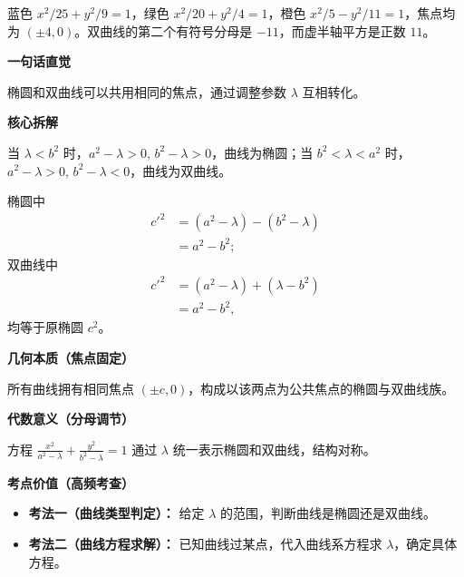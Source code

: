 \begin{explanationbox}
\begin{minipage}{\linewidth}
\begin{center}\end{center}
蓝色 $x^2/25+y^2/9=1$，绿色 $x^2/20+y^2/4=1$，橙色 $x^2/5-y^2/11=1$，焦点均为 $(\pm4,0)$。双曲线的第二个有符号分母是 $-11$，而虚半轴平方是正数 $11$。
\end{minipage}
\par\medskip

	\textbf{\textcolor{CExplanation}{一句话直觉}}

	\medskip
	椭圆和双曲线可以共用相同的焦点，通过调整参数 $\lambda$ 互相转化。

	\medskip
	\textbf{\textcolor{CExplanation}{核心拆解}}
	\begin{description}[style=nextline,leftmargin=2.8em,labelsep=0.5em,itemsep=0.45em]
		\item[\textbf{要点一（参数类型分类）：}]
			当 $\lambda<b^{2}$ 时，$a^{2}-\lambda>0$, $b^{2}-\lambda>0$，曲线为椭圆；当 $b^{2}<\lambda<a^{2}$ 时，$a^{2}-\lambda>0$, $b^{2}-\lambda<0$，曲线为双曲线。
		\item[\textbf{要点二（焦点恒等证明）：}]
			椭圆中
			\[
				\begin{aligned}
					c'^{2}&=(a^{2}-\lambda)-(b^{2}-\lambda)\\ &=a^{2}-b^{2};
			\end{aligned}
			\]
			双曲线中
			\[
				\begin{aligned}
					c'^{2}&=(a^{2}-\lambda)+(\lambda-b^{2})\\ &=a^{2}-b^{2},
			\end{aligned}
			\]
			均等于原椭圆 $c^{2}$。
	\end{description}

	\medskip
	\textbf{\textcolor{CExplanation}{几何本质（焦点固定）}}

	\medskip
	所有曲线拥有相同焦点 $(\pm c,0)$，构成以该两点为公共焦点的椭圆与双曲线族。

	\medskip
	\textbf{\textcolor{CExplanation}{代数意义（分母调节）}}

	\medskip
	方程 $\frac{x^{2}}{a^{2}-\lambda}+\frac{y^{2}}{b^{2}-\lambda}=1$ 通过 $\lambda$ 统一表示椭圆和双曲线，结构对称。

	\medskip
	\textbf{\textcolor{CExplanation}{考点价值（高频考查）}}
	\begin{itemize}[leftmargin=*,itemsep=0.5em,topsep=0.4em]
		\item \textbf{考法一（曲线类型判定）：} 给定 $\lambda$ 的范围，判断曲线是椭圆还是双曲线。
		\item \textbf{考法二（曲线方程求解）：} 已知曲线过某点，代入曲线系方程求 $\lambda$，确定具体方程。
	\end{itemize}


\end{explanationbox}
